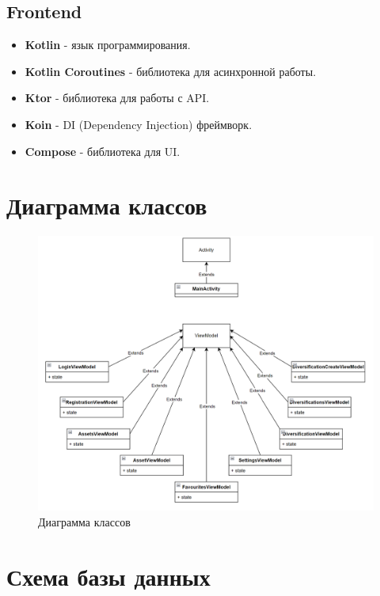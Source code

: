 \documentclass[a4paper, 14pt]{article}
\begin{document}
\subsection{Frontend}

\begin{itemize}
    \item \textbf{Kotlin} - язык программирования.
    \item \textbf{Kotlin Coroutines} - библиотека для асинхронной работы.
    \item \textbf{Ktor} - библиотека для работы с API.
    \item \textbf{Koin} - DI (Dependency Injection) фреймворк.
    \item \textbf{Compose} - библиотека для UI.
\end{itemize}

\section{Диаграмма классов}

\begin{figure}[H]
    \centering
    \includegraphics[width=17cm]{resources/15.png}
    \caption{Диаграмма классов}
\end{figure}

\section{Схема базы данных}
\end{document}
